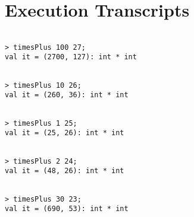 \documentclass{report}
\begin{document}
\section{Execution Transcripts}
\label{sec:execution-transc}

\setcounter{sessioncount}{0}
\begin{session}
\begin{scriptsize}
\begin{verbatim}

> timesPlus 100 27;
val it = (2700, 127): int * int 
\end{verbatim}
\end{scriptsize}
\end{session}

\begin{session}
\begin{scriptsize}
\begin{verbatim}

> timesPlus 10 26;
val it = (260, 36): int * int 
\end{verbatim}
\end{scriptsize}
\end{session}

\begin{session}
\begin{scriptsize}
\begin{verbatim}

> timesPlus 1 25;
val it = (25, 26): int * int 
\end{verbatim}
\end{scriptsize}
\end{session}

\begin{session}
\begin{scriptsize}
\begin{verbatim}

> timesPlus 2 24;
val it = (48, 26): int * int 
\end{verbatim}
\end{scriptsize}
\end{session}

\begin{session}
\begin{scriptsize}
\begin{verbatim}

> timesPlus 30 23;
val it = (690, 53): int * int
\end{verbatim}
\end{scriptsize}
\end{session}
\end{document}
